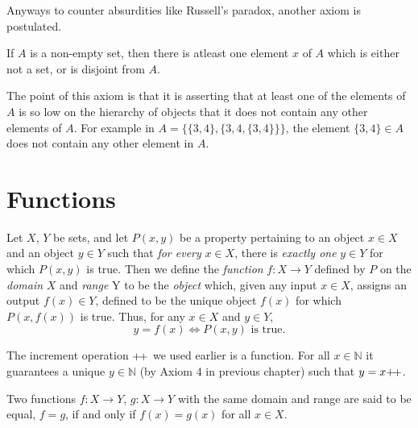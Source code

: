 \documentclass[12pt]{article}
\theoremstyle{remark}
\begin{document}
Anyways to counter absurdities like Russell's paradox, another axiom is postulated. 

\begin{important}
    If $ A $ is a non-empty set, then there is atleast one element $ x $ of $ A $ which is either not a set, or is disjoint from $ A $.
\end{important}

The point of this axiom is that it is asserting that at least one of the elements of $ A $ is so low on the hierarchy of objects that it does not contain any other elements of $ A $. For example in $ A = \{ \{3, 4\}, \{3, 4, \{3, 4\}\} \} $, the element $ \{3, 4\} \in A $ does not contain any other element in $ A $.

\section{Functions}%
\label{sec:Functions}

\begin{definition}[Functions]
   Let $ X $, $ Y $ be sets, and let $ P(x, y) $ be a property pertaining to an object $ x \in X $ and an object $ y \in Y $ such that \textit{for every} $ x \in X $, there is \textit{exactly one} $ y \in Y $ for which $ P(x, y) $ is true. Then we define the \textit{function} $ f : X \rightarrow Y $ defined by $ P $ on the \textit{domain} $ X $ and \textit{range} Y to be the \textit{object} which, given any input $ x \in X $, assigns an output $ f(x) \in Y $, defined to be the unique object $ f(x) $ for which $ P(x, f(x)) $ is true. Thus, for any $ x \in X $ and $ y \in Y $, 
   \begin{equation*}
	   y = f(x) \iff P(x, y) \text{ is true}.
   \end{equation*}
   
\end{definition}

\begin{example}
	The increment operation $ \inc $ we used earlier is a function. For all $ x \in \mathbb{N} $ it guarantees a unique $ y \in \mathbb{N} $ (by Axiom 4 in previous chapter) such that $ y = x\inc $.
\end{example}

\begin{definition}
    Two functions $ f : X \rightarrow Y $, $ g : X \rightarrow Y $ with the same domain and range are said to be equal, $ f = g $, if and only if $ f(x) = g(x) $ for all $ x \in X $.
\end{definition}
\end{document}

